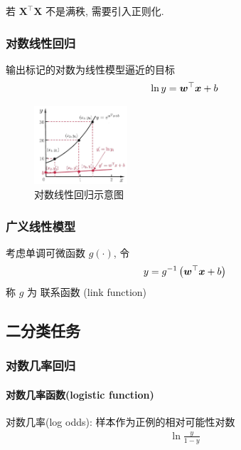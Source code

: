 若 $\bm{X}^\top\bm X$ 不是满秩, 需要引入正则化. %

\subsubsection{对数线性回归}
输出标记的对数为线性模型逼近的目标
\begin{align*}
    \ln y=\bm{w}^\top \bm{x} +b
\end{align*}

\begin{figure}[!htb]
    \centering
    \includegraphics[width=0.309\textwidth]{pic/ML3/对数线性回归示意图}
    \caption{对数线性回归示意图}
\end{figure}


\subsubsection{广义线性模型}
考虑单调可微函数 $g(\cdot)$, 令
\begin{align*}
    y=g^{-1}\left( \bm{w}^\top \bm{x}+b \right)
\end{align*}
称 $g$ 为 联系函数 (link function)

\subsection{二分类任务}

\subsubsection{对数几率回归}

\paragraph{对数几率函数(logistic function)}


\begin{definition}
    对数几率(log odds): 样本作为正例的相对可能性对数
    \begin{align*}
        \ln\frac{y}{1-y}
    \end{align*}
\end{definition}

